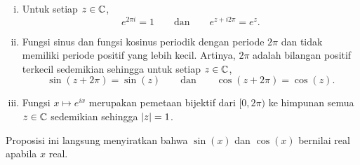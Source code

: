 \begin{prop}
\begin{enumerate}[(i)]
\item
Untuk setiap $z \in {\mathbb{C}}$,
\begin{equation*}
e^{2\pi i} = 1 \qquad \text{dan} \qquad e^{z + i 2\pi} = e^z.
\end{equation*}
\item
Fungsi sinus dan fungsi kosinus periodik dengan periode $2\pi$ dan tidak memiliki periode positif
yang lebih kecil. Artinya, $2\pi$ adalah bilangan positif terkecil sedemikian sehingga untuk setiap $z \in {\mathbb{C}}$,
\begin{equation*}
\sin(z+2\pi) = \sin(z)
\qquad \text{dan} \qquad
\cos(z+2\pi) = \cos(z) .
\end{equation*}
\item
Fungsi $x \mapsto e^{ix}$ merupakan pemetaan bijektif dari $[0,2\pi)$
ke himpunan semua $z \in {\mathbb{C}}$ sedemikian sehingga $\lvert {z} \rvert = 1$.
\end{enumerate}
\end{prop}

Proposisi ini langsung menyiratkan bahwa $\sin(x)$ dan $\cos(x)$ bernilai
real apabila $x$ real.

